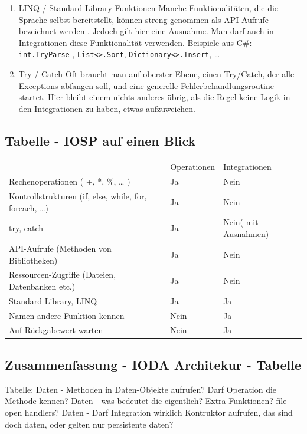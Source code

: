 \documentclass[11pt]{article}
\begin{document}
\begin{enumerate}
\item LINQ / Standard-Library Funktionen
\label{sec:orgheadline38}
Manche Funktionalitäten, die die Sprache selbst bereitstellt, können streng genommen als API-Aufrufe bezeichnet werden
. Jedoch gilt hier eine Ausnahme. Man darf auch in Integrationen diese Funktionalität verwenden.
Beispiele aus C\#:
\texttt{int.TryParse} , \texttt{List<>.Sort}, \texttt{Dictionary<>.Insert}, \ldots{}

\item Try / Catch
\label{sec:orgheadline39}
Oft braucht man auf oberster Ebene, einen Try/Catch, der alle Exceptions abfangen soll, und eine generelle Fehlerbehandlungsroutine
startet. Hier bleibt einem nichts anderes übrig, als die Regel keine Logik in den Integrationen zu haben, etwas aufzuweichen.
\end{enumerate}


\subsection{Tabelle -  IOSP auf einen Blick}
\label{sec:orgheadline42}


\begin{center}
\begin{tabular}{lll}
 & Operationen & Integrationen\\
Rechenoperationen ( +, *, \%, \ldots{} ) & Ja & Nein\\
Kontrollstrukturen (if, else, while, for, foreach, \ldots{}) & Ja & Nein\\
try, catch & Ja & Nein( mit Ausnahmen)\\
API-Aufrufe (Methoden von Bibliotheken) & Ja & Nein\\
Ressourcen-Zugriffe (Dateien, Datenbanken etc.) & Ja & Nein\\
Standard Library, LINQ & Ja & Ja\\
Namen andere Funktion kennen & Nein & Ja\\
Auf Rückgabewert warten & Nein & Ja\\
\end{tabular}
\end{center}

\subsection{Zusammenfassung - IODA Architekur -  Tabelle}
\label{sec:orgheadline43}

Tabelle:
Daten - Methoden in Daten-Objekte aufrufen? Darf Operation die Methode kennen?
Daten - was bedeutet die eigentlich? Extra Funktionen? file open handlers?
Daten - Darf Integration wirklich Kontruktor aufrufen, das sind doch daten, oder gelten nur persistente daten?
\end{document}
